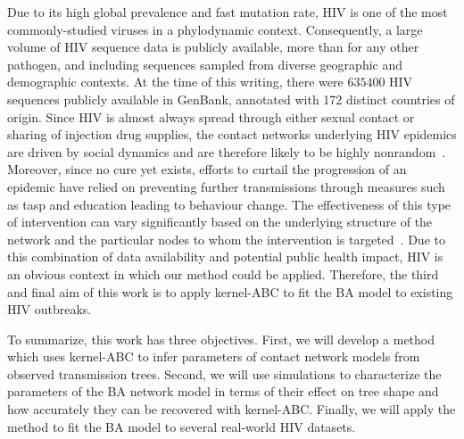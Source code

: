Due to its high global prevalence and fast mutation rate, \gls{HIV} is one of
the most commonly-studied viruses in a phylodynamic context. Consequently, a
large volume of \gls{HIV} sequence data is publicly available, more than for
any other pathogen, and including sequences sampled from diverse geographic and
demographic contexts. At the time of this writing, there were $635400$ HIV
sequences publicly available in GenBank, annotated with 172 distinct countries
of origin. Since \gls{HIV} is almost always spread through either sexual
contact or sharing of injection drug supplies, the contact networks underlying
\gls{HIV} epidemics are driven by social dynamics and are therefore likely to
be highly nonrandom~\autocite{clemencon2015statistical}. Moreover, since no
cure yet exists, efforts to curtail the progression of an epidemic have relied
on preventing further transmissions through measures such as \gls{tasp} and
education leading to behaviour change. The effectiveness of this type of
intervention can vary significantly based on the underlying structure of the
network and the particular nodes to whom the intervention is
targeted~\autocite{little2014using,wang2015targeting}. Due to this combination
of data availability and potential public health impact, \gls{HIV} is an
obvious context in which our method could be applied. Therefore, the third and
final aim of this work is to apply kernel-\gls{ABC} to fit the \gls{BA} model
to existing \gls{HIV} outbreaks.

To summarize, this work has three objectives. First, we will develop a method
which uses kernel-\gls{ABC} to infer parameters of contact network models from
observed transmission trees. Second, we will use simulations to characterize
the parameters of the \gls{BA} network model in terms of their effect on tree
shape and how accurately they can be recovered with kernel-\gls{ABC}. Finally,
we will apply the method to fit the \gls{BA} model to several real-world
\gls{HIV} datasets.

